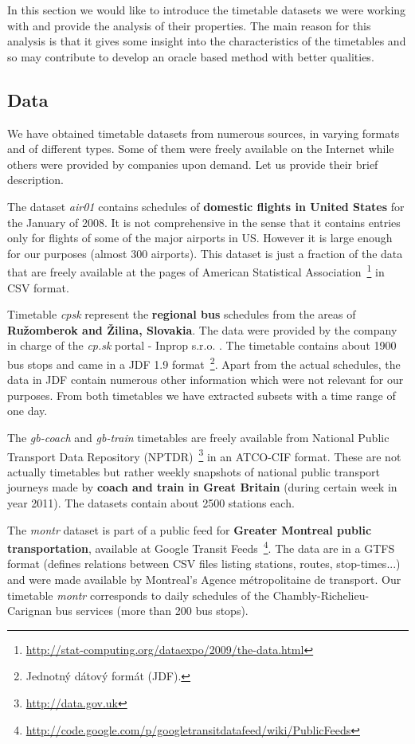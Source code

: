 In this section we would like to introduce the timetable datasets we were working with and provide the analysis of their properties. The main reason for this analysis is that it gives some insight into the characteristics of the timetables and so may contribute to develop an oracle based method with better qualities.

\subsection{Data}

	We have obtained timetable datasets from numerous sources, in varying formats and of different types. Some of them were freely available on the Internet while others were provided by companies upon demand. Let us provide their brief description.
	
	The dataset \textit{air01} contains schedules of \textbf{domestic flights in United States} for the January of 2008. It is not comprehensive in the sense that it contains entries only for flights of some of the major airports in US. However it is large enough for our purposes (almost 300 airports). This dataset is just a fraction of the data that are freely available at the pages of American Statistical Association~\footnote{\url{http://stat-computing.org/dataexpo/2009/the-data.html}} in CSV format.
	
	Timetable \textit{cpsk} represent the \textbf{regional bus} schedules from the areas of \textbf{Ružomberok and Žilina, Slovakia}. The data were provided by the company in charge of the \textit{cp.sk} portal - Inprop s.r.o. . The timetable contains about 1900 bus stops and came in a JDF 1.9 format~\footnote{Jednotný dátový formát (JDF).}. Apart from the actual schedules, the data in JDF contain numerous other information which were not relevant for our purposes. From both timetables we have extracted subsets with a time range of one day.
	
	The \textit{gb-coach} and \textit{gb-train} timetables are freely available from National Public Transport Data Repository (NPTDR)~\footnote{\url{http://data.gov.uk}} in an ATCO-CIF format. These are not actually timetables but rather weekly snapshots of national public transport journeys made by \textbf{coach and train in Great Britain} (during certain week in year 2011). The datasets contain about 2500 stations each.
	
	The \textit{montr} dataset is part of a public feed for \textbf{Greater Montreal public transportation}, available at Google Transit Feeds~\footnote{\url{http://code.google.com/p/googletransitdatafeed/wiki/PublicFeeds}}. The data are in a GTFS format (defines relations between CSV files listing stations, routes, stop-times...) and were made available by Montreal's Agence métropolitaine de transport. Our timetable \textit{montr} corresponds to daily schedules of the Chambly-Richelieu-Carignan bus services (more than 200 bus stops).
	
